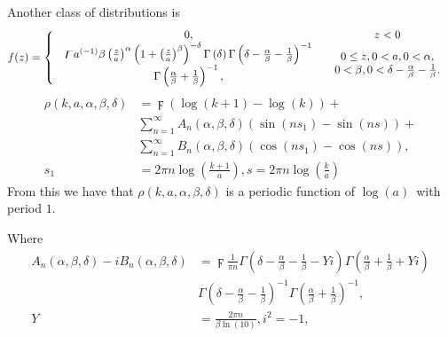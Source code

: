 \documentclass[titlepage,fleqn]{article}%
\begin{document}
Another class of distributions
\cite{walck}
is%
\begin{equation}
f(z)=\left\{
\begin{array}
[c]{cc}%
0, & z<0\\%
\begin{array}
[c]{c}%
\digamma a^{(-1)}\beta\left(  \frac{z}{a}\right)  ^{\alpha}\left(  1+\left(
\frac{z}{a}\right)  ^{\beta}\right)  ^{-\delta}\Gamma\left(  \delta\right)
\Gamma\left(  \delta-\frac{\alpha}{\beta}-\frac{1}{\beta}\right)  ^{-1}\\
\Gamma\left(  \frac{\alpha}{\beta}+\frac{1}{\beta}\right)  ^{-1},
\end{array}
&
\begin{array}
[c]{c}%
0\leq z,0<a,0<\alpha,\\
0<\beta,0<\delta-\frac{\alpha}{\beta}-\frac{1}{\beta}.
\end{array}
\end{array}
\right.
\end{equation}%
\begin{align*}
\rho(k,a,\alpha,\beta,\delta)  &  =\digamma\left(  \log(k+1)-\log(k)\right)
+\\
&
{\displaystyle\sum\limits_{n=1}^{\infty}}
A_{n}(\alpha,\beta,\delta)\left(  \sin\left(  ns_{1}\right)  -\sin\left(
ns\right)  \right)  +\\
&
{\displaystyle\sum\limits_{n=1}^{\infty}}
B_{n}(\alpha,\beta,\delta)\left(  \cos\left(  ns_{1}\right)  -\cos\left(
ns\right)  \right)  ,\\
s_{1}  &  =2\pi n\log\left(  \frac{k+1}{a}\right)  ,s=2\pi n\log\left(
\frac{k}{a}\right)
\end{align*}
From this we have that $\rho(k,a,\alpha,\beta,\delta)$ is a periodic function
of $\log\left(  a\right)  $\ with period $1.$

Where%
\begin{align}
A_{n}(\alpha,\beta,\delta)-iB_{n}(\alpha,\beta,\delta)  &  =\digamma\frac
{1}{\pi n}\Gamma\left(  \delta-\frac{\alpha}{\beta}-\frac{1}{\beta}-Yi\right)
\Gamma\left(  \frac{\alpha}{\beta}+\frac{1}{\beta}+Yi\right) \nonumber\\
&  \Gamma\left(  \delta-\frac{\alpha}{\beta}-\frac{1}{\beta}\right)
^{-1}\Gamma\left(  \frac{\alpha}{\beta}+\frac{1}{\beta}\right)  ^{-1},\\
Y  &  =\frac{2\pi n}{\beta\ln(10)},i^{2}=-1,\nonumber
\end{align}
\end{document}
